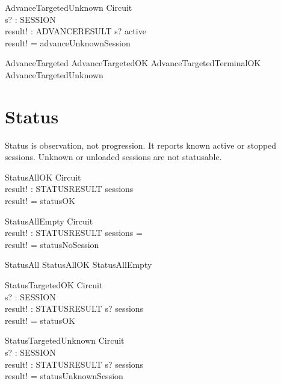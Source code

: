 \documentclass[a4paper,10pt,fleqn]{article}
\begin{document}
\begin{schema}{AdvanceTargetedUnknown}
  \Xi Circuit \\
  s? : SESSION \\
  result! : ADVANCERESULT
\where
  s? \notin active \\
  result! = advanceUnknownSession
\end{schema}

\begin{zed}
  AdvanceTargeted  AdvanceTargetedOK \lor AdvanceTargetedTerminalOK
    \lor AdvanceTargetedUnknown
\end{zed}

\section{Status}

Status is observation, not progression. It reports known active or stopped
sessions. Unknown or unloaded sessions are not statusable.

\begin{schema}{StatusAllOK}
  \Xi Circuit \\
  result! : STATUSRESULT
\where
  sessions \neq \emptyset \\
  result! = statusOK
\end{schema}

\begin{schema}{StatusAllEmpty}
  \Xi Circuit \\
  result! : STATUSRESULT
\where
  sessions = \emptyset \\
  result! = statusNoSession
\end{schema}

\begin{zed}
  StatusAll  StatusAllOK \lor StatusAllEmpty
\end{zed}

\begin{schema}{StatusTargetedOK}
  \Xi Circuit \\
  s? : SESSION \\
  result! : STATUSRESULT
\where
  s? \in sessions \\
  result! = statusOK
\end{schema}

\begin{schema}{StatusTargetedUnknown}
  \Xi Circuit \\
  s? : SESSION \\
  result! : STATUSRESULT
\where
  s? \notin sessions \\
  result! = statusUnknownSession
\end{schema}
\end{document}
